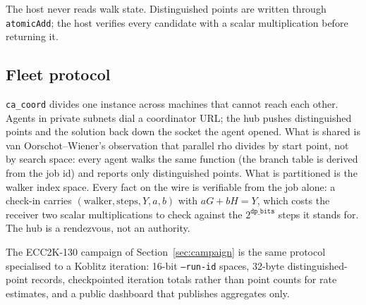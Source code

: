 The host never reads walk state. Distinguished points are written
through \texttt{atomicAdd}; the host verifies every candidate with a
scalar multiplication before returning it.

\subsection{Fleet protocol}
\label{sec:rho-fleet}

\texttt{ca\_coord} divides one instance across machines that cannot
reach each other. Agents in private subnets dial a coordinator URL;
the hub pushes distinguished points and the solution back down the
socket the agent opened. What is shared is van Oorschot--Wiener's
observation that parallel rho divides by start point, not by search
space: every agent walks the same function (the branch table is
derived from the job id) and reports only distinguished points. What
is partitioned is the walker index space. Every fact on the wire is
verifiable from the job alone: a check-in carries $({\mathrm{walker}},
{\mathrm{steps}}, Y, a, b)$ with $aG+bH=Y$, which costs the receiver
two scalar multiplications to check against the $2^{\texttt{dp\_bits}}$
steps it stands for. The hub is a rendezvous, not an
authority.

The ECC2K-130 campaign of Section~\ref{sec:campaign} is the same
protocol specialised to a Koblitz iteration: 16-bit \texttt{--run-id}
spaces, 32-byte distinguished-point records, checkpointed iteration
totals rather than point counts for rate estimates, and a public
dashboard that publishes aggregates only.
